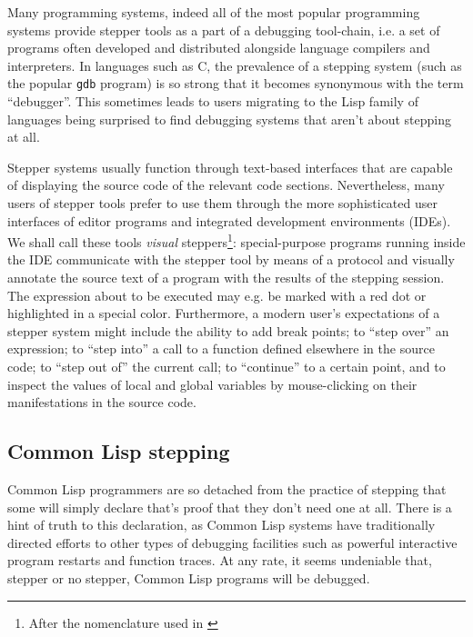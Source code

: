 \documentclass[format=sigconf]{acmart}
\begin{document}
Many programming systems, indeed all of the most popular programming
systems provide stepper tools as a part of a debugging tool-chain,
i.e. a set of programs often developed and distributed alongside
language compilers and interpreters.  In languages such as C, the
prevalence of a stepping system (such as the popular \texttt{gdb}
program) is so strong that it becomes synonymous with the term
``debugger''. This sometimes leads to users migrating to the Lisp
family of languages being surprised to find debugging systems that
aren't about stepping at all.

Stepper systems usually function through text-based interfaces that
are capable of displaying the source code of the relevant code
sections.  Nevertheless, many users of stepper tools prefer to use
them through the more sophisticated user interfaces of editor programs
and integrated development environments (IDEs).  We shall call these
tools \emph{visual} steppers\footnote{After the nomenclature used in
  \cite{annotation-based}}: special-purpose programs running inside
the IDE communicate with the stepper tool by means of a protocol and
visually annotate the source text of a program with the results of the
stepping session.  The expression about to be executed may e.g. be
marked with a red dot or highlighted in a special color.  Furthermore,
a modern user's expectations of a stepper system might include the
ability to add break points; to ``step over'' an expression; to ``step
into'' a call to a function defined elsewhere in the source code; to
``step out of'' the current call; to ``continue'' to a certain point,
and to inspect the values of local and global variables by
mouse-clicking on their manifestations in the source code.

\subsection{Common Lisp stepping}


Common Lisp programmers are so detached from the practice of stepping
that some will simply declare that's proof that they don't need one at
all.  There is a hint of truth to this declaration, as Common Lisp
systems have traditionally directed efforts to other types of
debugging facilities such as powerful interactive program restarts and
function traces.  At any rate, it seems undeniable that, stepper or no
stepper, Common Lisp programs will be debugged.
\end{document}
